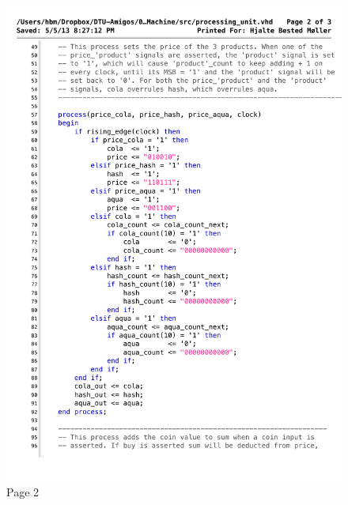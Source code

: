 \begin{figure}[!h]
\centering
\includegraphics[scale=0.6]{figs/processing_unit_2.pdf}
\caption{Page 2}
\label{vhd:proceunit2}
\end{figure}

